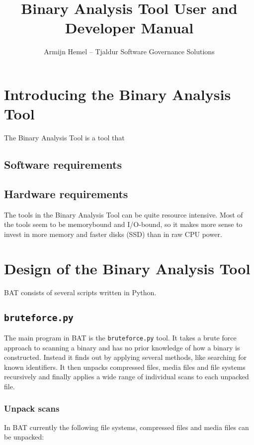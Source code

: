 \documentclass[10pt]{article}
\author{Armijn Hemel -- Tjaldur Software Governance Solutions}
\title{Binary Analysis Tool User and Developer Manual}
\begin{document}
\maketitle
\thispagestyle{empty}

\section{Introducing the Binary Analysis Tool}

The Binary Analysis Tool is a tool that 

\subsection{Software requirements}

\subsection{Hardware requirements}

The tools in the Binary Analysis Tool can be quite resource intensive. Most of
the tools seem to be memorybound and I/O-bound, so it makes more sense to
invest in more memory and faster disks (SSD) than in raw CPU power.

\section{Design of the Binary Analysis Tool}

BAT consists of several scripts written in Python.

\subsection{\texttt{bruteforce.py}}

The main program in BAT is the \texttt{bruteforce.py} tool. It takes a brute
force approach to scanning a binary and has no prior knowledge of how a binary
is constructed. Instead it finds out by applying several methods, like
searching for known identifiers. It then unpacks compressed files, media files
and file systems recursively and finally applies a wide range of individual
scans to each unpacked file.

\subsubsection{Unpack scans}

In BAT currently the following file systems, compressed files and media files
can be unpacked:
\end{document}
